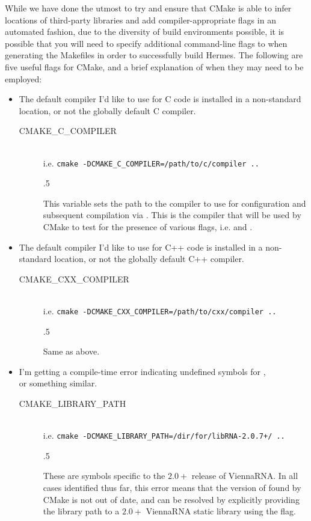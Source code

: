 \documentclass[11pt]{article}
\begin{document}
While we have done the utmost to try and ensure that CMake is able to infer locations of third-party libraries and add compiler-appropriate flags in an automated fashion, due to the diversity of build environments possible, it is possible that you will need to specify additional command-line flags to  when generating the Makefiles in order to successfully build Hermes. The following are five useful flags for CMake, and a brief explanation of when they may need to be employed:
\begin{itemize}
  \item The default compiler I'd like to use for C code is installed in a non-standard location, or not the globally default C compiler.
  \begin{description}
    \item[CMAKE\_C\_COMPILER] \hfill \\
    i.e. {\tt cmake -DCMAKE\_C\_COMPILER=/path/to/c/compiler ..} \hfill \\
    \begin{spacing}
      {.5}
    \end{spacing}
    This variable sets the path to the compiler to use for configuration and subsequent compilation via . This is the compiler that will be used by CMake to test for the presence of various flags, i.e.  and .
  \end{description}

  \item The default compiler I'd like to use for C++ code is installed in a non-standard location, or not the globally default C++ compiler.
  \begin{description}
    \item[CMAKE\_CXX\_COMPILER] \hfill \\
    i.e. {\tt cmake -DCMAKE\_CXX\_COMPILER=/path/to/cxx/compiler ..} \hfill \\
    \begin{spacing}
      {.5}
    \end{spacing}
    Same as above.
  \end{description}

  \item I'm getting a compile-time error indicating undefined symbols for , \\
   or something similar.
  \begin{description}
    \item[CMAKE\_LIBRARY\_PATH] \hfill \\
    i.e. {\tt cmake -DCMAKE\_LIBRARY\_PATH=/dir/for/libRNA-2.0.7+/ ..} \hfill \\
    \begin{spacing}
      {.5}
    \end{spacing}
    These are  symbols specific to the $2.0+$ release of ViennaRNA. In all cases identified thus far, this error means that the version of  found by CMake is not out of date, and can be resolved by explicitly providing the library path to a $2.0+$ ViennaRNA static library using the  flag.
  \end{description}


\end{itemize}
\end{document}
